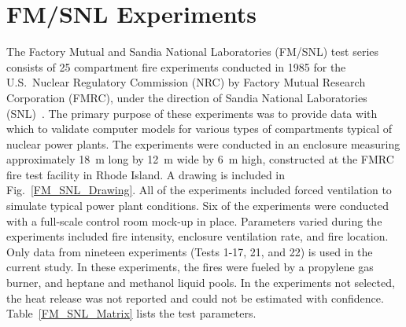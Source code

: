 \section{FM/SNL Experiments}
\label{FM_SNL_Description}


The Factory Mutual and Sandia National Laboratories (FM/SNL) test series consists of 25 compartment fire experiments conducted in 1985 for the U.S.~Nuclear Regulatory Commission (NRC) by Factory Mutual Research Corporation (FMRC), under the direction of Sandia National Laboratories (SNL)~\cite{Nowlen:NUREG4681,Nowlen:NUREG4527}. The primary purpose of these experiments was to provide data with which to validate computer models for various types of compartments typical of nuclear power plants. The experiments were conducted in an enclosure measuring approximately 18~m long by 12~m wide by 6~m high, constructed at the FMRC fire test facility in Rhode Island. A drawing is included in Fig.~\ref{FM_SNL_Drawing}. All of the experiments included forced ventilation to simulate typical power plant conditions. Six of the experiments were conducted with a full-scale control room mock-up in place. Parameters varied during the experiments included fire intensity, enclosure ventilation rate, and fire location. Only data from nineteen experiments (Tests 1-17, 21, and 22) is used in the current study. In these experiments, the fires were fueled by a propylene gas burner, and heptane and methanol liquid pools. In the experiments not selected, the heat release was not reported and could not be estimated with confidence. Table~\ref{FM_SNL_Matrix} lists the test parameters.

